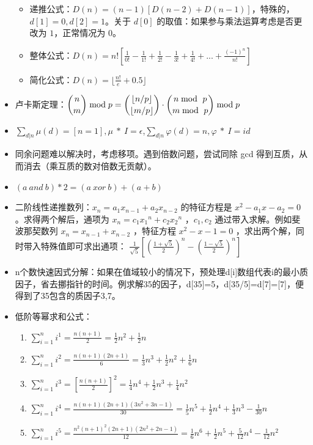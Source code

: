 \documentclass[a4paper,11pt]{article}
\begin{document}
\begin{itemize}
  \begin{itemize}
  \item
    递推公式：\(D(n) = (n-1) [D(n-2) + D(n-1)]\)，特殊的，\(d[1]=0,d[2]=1\)。关于
    \(d[0]\) 的取值：如果参与乘法运算考虑是否更改为 \(1\)，正常情况为
    \(0\)。
  \item
    整体公式：\(D(n) = n! [\frac{1}{0!} - \frac{1}{1!} + \frac{1}{2!} - \frac{1}{3!} + \frac{1}{4!} + ... + \frac{(-1)^n}{n!}]\)
  \item
    简化公式：\(D(n) = \lfloor \frac{n!}{e}+0.5\rfloor\)
  \end{itemize}
\item
  卢卡斯定理：\(\dbinom{n}{m}\bmod p=\dbinom{\lfloor n/p\rfloor}{\lfloor m/p\rfloor}\cdot\dbinom{n\bmod\ p}{m\bmod\ p}\bmod p\)
\item
  \(\sum\limits_{d|n}{\mu(d)}=[n=1],\mu\ *\ I=\epsilon\),\(\sum\limits_{d|n}{\varphi(d)}=n,\varphi\ *\ I=id\)
\item
  同余问题难以解决时，考虑移项。遇到倍数问题，尝试同除 gcd 得到互质，从而消去（乘互质的数对倍数无贡献）。
\item
  \((a\ and\ b)*2=(a\ xor\ b)+(a+b)\)
\item
  二阶线性递推数列：\(x_n=a_1x_{n-1}+a_2x_{n-2}\) 的特征方程是 \(x^2-a_1x-a_2=0\) 。求得两个解后，通项为 \(x_n=c_1{x_1}^n+c_2{x_2}^n\) ，\(c_1,c_2\) 通过带入求解。例如斐波那契数列 \(x_n=x_{n-1}+x_{n-2}\) ，特征方程 \(x^2-x-1=0\) ，求出两个解，同时带入特殊值即可求出通项： \(\frac{1}{\sqrt{5}}[(\frac{1+\sqrt{5}}{2})^n-(\frac{1-\sqrt{5}}{2})^n]\)
\item
  n个数快速因式分解：如果在值域较小的情况下，预处理d[i]数组代表i的最小质因子，省去挪指针的时间。例求解35的因子，d[35]=5，d[35/5]=d[7]=[7]，便得到了35包含的质因子3,7。
\item 
  低阶等幂求和公式：
  \begin{enumerate}
    \item $\sum\limits_{i=1}^{n}{i^1}=\frac{n(n+1)}{2}=\frac{1}{2}n^2+\frac{1}{2}n$
    \item $\sum\limits_{i=1}^{n}{i^2}=\frac{n(n+1)(2n+1)}{6}=\frac{1}{3}n^3+\frac{1}{2}n^2+\frac{1}{6}n$
    \item $\sum\limits_{i=1}^{n}{i^3}=\left[\frac{n(n+1)}{2}\right]^2=\frac{1}{4}n^4+\frac{1}{2}n^3+\frac{1}{4}n^2$
    \item $\sum\limits_{i=1}^{n}{i^4}=\frac{n(n+1)(2n+1)(3n^2+3n-1)}{30}=\frac{1}{5}n^5+\frac{1}{2}n^4+\frac{1}{3}n^3-\frac{1}{30}n$
    \item $\sum\limits_{i=1}^{n}{i^5}=\frac{n^2(n+1)^2(2n+1)(2n^2+2n-1)}{12}=\frac{1}{6}n^6+\frac{1}{2}n^5+\frac{5}{12}n^4-\frac{1}{12}n^2$
  \end{enumerate}

\end{itemize}
\end{document}
